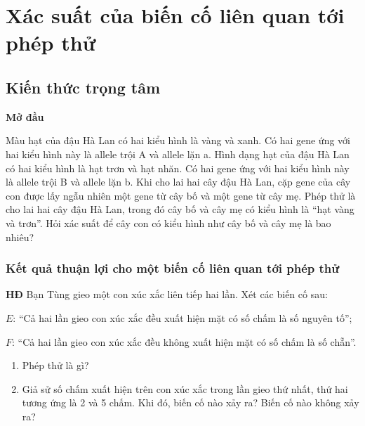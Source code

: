 
\section{Xác suất của biến cố liên quan tới phép thử}

\begin{lesson}
    \subsection{Kiến thức trọng tâm}

    \textbf{Mở đầu}

    Màu hạt của đậu Hà Lan có hai kiểu hình là vàng và xanh. Có hai gene ứng với hai kiểu hình này là allele trội A và allele lặn a. Hình dạng hạt của đậu Hà Lan có hai kiểu hình là hạt trơn và hạt nhăn. Có hai gene ứng với hai kiểu hình này là allele trội B và allele lặn b. Khi cho lai hai cây đậu Hà Lan, cặp gene của cây con được lấy ngẫu nhiên một gene từ cây bố và một gene từ cây mẹ. Phép thử là cho lai hai cây đậu Hà Lan, trong đó cây bố và cây mẹ có kiểu hình là “hạt vàng và trơn”. Hỏi xác suất để cây con có kiểu hình như cây bố và cây mẹ là bao nhiêu?

    \answerline

    \subsubsection{Kết quả thuận lợi cho một biến cố liên quan tới phép thử}

    \textbf{HĐ} Bạn Tùng gieo một con xúc xắc liên tiếp hai lần. Xét các biến cố sau:

    $E$: “Cả hai lần gieo con xúc xắc đều xuất hiện mặt có số chấm là số nguyên tố”;

    $F$: “Cả hai lần gieo con xúc xắc đều không xuất hiện mặt có số chấm là số chẵn”.

    \begin{enumerate}[label=\alph*)]
        \item Phép thử là gì?
        \item Giả sử số chấm xuất hiện trên con xúc xắc trong lần gieo thứ nhất, thứ hai tương ứng là 2 và 5 chấm. Khi đó, biến cố nào xảy ra? Biến cố nào không xảy ra?
    \end{enumerate}


\end{lesson}
